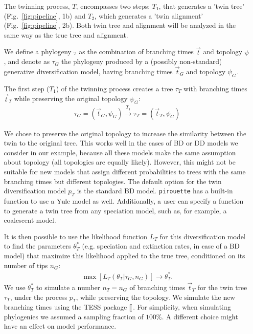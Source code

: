 The twinning process, $T$, encompasses two steps:
$T_1$, that generates a 'twin tree' (Fig.~\ref{fig:pipeline}, 1b) 
and $T_2$, which generates a 'twin alignment' (Fig.~\ref{fig:pipeline}, 2b).
Both twin tree and alignment will be analyzed in the same way as the true tree and alignment.

We define a phylogeny $\tau$ as the combination of
branching times $\Vec{t}$ and topology $\psi$, 
and denote as $\tau_{\mathit{G}}$ the phylogeny 
produced by a (possibly non-standard) generative diversification model, 
having branching times $\Vec{t}_{\mathit{G}}$ and 
topology $\psi_{\mathit{G}}$.

The first step ($T_1$) of the twinning process creates a tree $\tau_{\mathit{T}}$
with branching times $\Vec{t}_{\mathit{T}}$ while preserving the original
topology $\psi_{\mathit{G}}$:
\begin{align}
  \tau_{\mathit{G}} = (\Vec{t}_{\mathit{G}}, \psi_{\mathit{G}}) 
  \xrightarrow[]{\mathit{T_1}} 
  \tau_{\mathit{T}} = (\Vec{t}_{\mathit{T}}, \psi_{\mathit{G}})
\end{align}

We chose to preserve the original topology to 
increase the similarity between the twin to the original tree. 
This works well in the cases of BD or DD models 
we consider in our example, because all these models make the same
assumption about topology (all topologies are equally likely).
However, this might not be suitable for new models that assign different probabilities
to trees with the same branching times but different topologies.
The default option for the twin diversification model $p_T$ 
is the standard BD model.
\verb;pirouette; has a built-in function to use a Yule model as well.
Additionally, a user can specify a function to generate a twin tree
from any speciation model, such as, for example, a coalescent model.

It is then possible to use the likelihood function 
$L_{\mathit{T}}$ for this diversification model to find 
the parameters $\theta^{*}_{\mathit{T}}$ 
(e.g. speciation and extinction rates, in case of a BD model) 
that maximize this likelihood applied to the true tree, conditioned on its number of tips $n_{\mathit{G}}$:
\begin{align}
    \max[L_{\mathit{T}}(\theta_{\mathit{T}}|\tau_{\mathit{G}}, n_{\mathit{G}})] 
\rightarrow \theta^{*}_{\mathit{T}}.
\end{align}
We use $\theta^{*}_{\mathit{T}}$ to simulate a number 
$n_{\mathit{T}} = n_{\mathit{G}}$ 
of branching times $\Vec{t}_{\mathit{T}}$ for the twin tree 
$\tau_{\mathit{T}}$, under the process $p_{T}$, 
while preserving the topology. 
We simulate the new branching times using the TESS 
package [\cite{TESS}].
For simplicity, when simulating phylogenies we assumed a sampling fraction 
of $100\%$. A different choice might have an effect on model performance.

